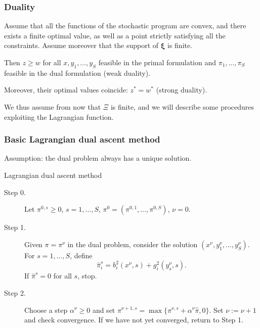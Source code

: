 \documentclass[french]{beamer}
\def\bxi{\boldsymbol\xi}
\begin{document}
\begin{frame}
\frametitle{Duality}

\begin{theorem}
Assume that all the functions of the stochastic program are convex,
and there exists a finite optimal value, as well as a point strictly satisfying all the constraints.
Assume moreover that the support of $\bxi$ is finite.

\mbox{}

Then $z \geq w$ for all $x, y_1,\ldots{},y_S$ feasible in the primal formulation and $\pi_1,\ldots{},\pi_S$ feasible in the dual formulation (weak duality).

\mbox{}

Moreover, their optimal values coincide: $z^* = w^*$ (strong duality).
\end{theorem}

\mbox{}

We thus assume from now that {\red $\Xi$ is finite}, and we will describe some procedures exploiting the Lagrangian function.

\end{frame}

\begin{frame}
\frametitle{Basic Lagrangian dual ascent method}

Assumption: the dual problem always has a unique solution.

\begin{algo}{Lagrangian dual ascent method}
\begin{description}
\item[Step 0.] Let $\pi^{0,s} \geq 0$, $s = 1,\ldots,S$, $\pi^0 = (\pi^{0,1},\ldots,\pi^{0,S})$, $\nu = 0$.
\item[Step 1.]
Given $\pi = \pi^{\nu}$ in the dual problem, consider the solution
$(x^{\nu}, y_1^{\nu},\ldots{},y_S^{\nu})$.
For $s = 1, \ldots{}, S$, define
$$
\hat{\pi}_i^s = b_i^2(x^{\nu},s)+g_i^2(y_s^{\nu},s).
$$
If $\hat{\pi}^s = 0$ for all $s$, stop.
\item[Step 2.]
Choose a step $\alpha^{\nu} \geq 0$ and set
$
\pi^{\nu+1,s} = \max\{\pi^{\nu,s} + \alpha^{\nu}\hat{\pi}, 0\}.
$
Set $\nu := \nu+1$ and check convergence. If we have not yet converged, return to Step 1.
\end{description}
\end{algo}

\end{frame}
\end{document}
